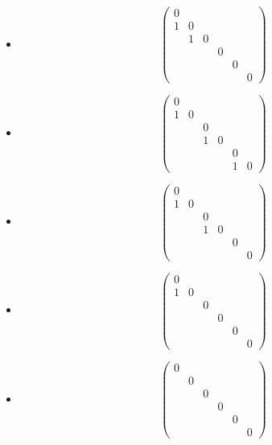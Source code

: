 \documentclass[11pt,a4paper]{article}
\begin{document}
{\begin{itemize}
\[
\begin{pmatrix}
0&&&&&\\1&0&&&&\\&1&0&&&\\&&&0&&\\&&&1&0&\\&&&&&0
\end{pmatrix}
\]
\item
\[
\begin{pmatrix}
0&&&&&\\1&0&&&&\\&1&0&&&\\&&&0&&\\&&&&0&\\&&&&&0
\end{pmatrix}
\]
\item
\[
\begin{pmatrix}
0&&&&&\\1&0&&&&\\&&0&&&\\&&1&0&&\\&&&&0&\\&&&&1&0
\end{pmatrix}
\]
\item
\[
\begin{pmatrix}
0&&&&&\\1&0&&&&\\&&0&&&\\&&1&0&&\\&&&&0&\\&&&&&0
\end{pmatrix}
\]
\item
\[
\begin{pmatrix}
0&&&&&\\1&0&&&&\\&&0&&&\\&&&0&&\\&&&&0&\\&&&&&0
\end{pmatrix}
\]
\item
\[
\begin{pmatrix}
0&&&&&\\&0&&&&\\&&0&&&\\&&&0&&\\&&&&0&\\&&&&&0
\end{pmatrix}
\]
\end{itemize}
}
\end{document}
